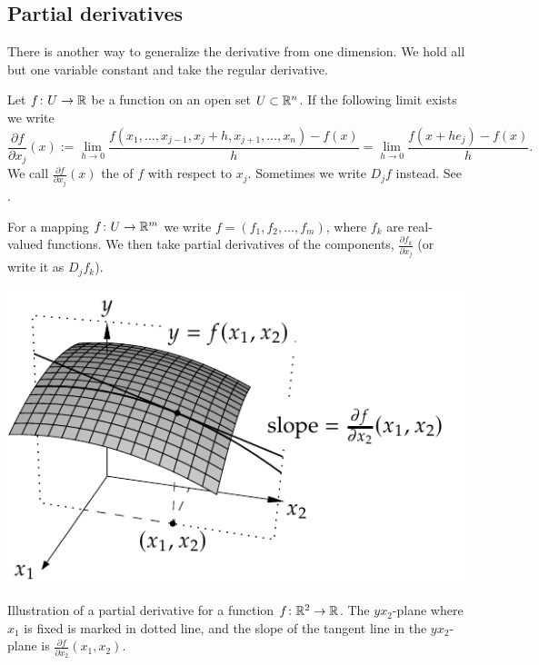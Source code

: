 \subsection{Partial derivatives}

There is another way to generalize the derivative from one dimension.
We hold all but one variable constant and take the regular
derivative.

\begin{defn}
Let
$f \colon U \to {\mathbb{R}}$ be a function on an open set $U \subset {\mathbb{R}}^n$.
If the following limit exists we write
\begin{equation*}
\frac{\partial f}{\partial x_j} (x) := 
\lim_{h\to 0}\frac{f(x_1,\ldots,x_{j-1},x_j+h,x_{j+1},\ldots,x_n)-f(x)}{h}
=
\lim_{h\to 0}\frac{f(x+h e_j)-f(x)}{h} .
\end{equation*}
We call 
$\frac{\partial f}{\partial x_j} (x)$ the \emph{}
of $f$
with respect to $x_j$.  Sometimes we write $D_j f$ instead.
See .

For a mapping $f \colon U \to {\mathbb{R}}^m$ we write
$f = (f_1,f_2,\ldots,f_m)$, where $f_k$ are real-valued
functions.  We then take partial derivatives of
the components,
$\frac{\partial f_k}{\partial x_j}$ (or write it as $D_j f_k$).
\end{defn}

\begin{myfigureht}
\includegraphics{figures/svpartder}
\caption{Illustration of a partial derivative for a function $f \colon {\mathbb{R}}^2
\to {\mathbb{R}}$.  The $yx_2$-plane where $x_1$ is fixed is marked in dotted line,
and the slope of the tangent line in the $yx_2$-plane is
$\frac{\partial f}{\partial x_2}(x_1,x_2)$.\label{fig:svpartder}}
\end{myfigureht}

